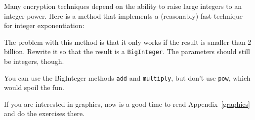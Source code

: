 \begin{exercise}
Many encryption techniques depend on the
ability to raise large integers to an integer power.  Here is a
method that implements a (reasonably) fast technique for integer
exponentiation:


The problem with this method is that it only works if the result
is smaller than 2 billion.  Rewrite it so that the result is
a {\tt BigInteger}.  The parameters should still be integers, though.

You can use the BigInteger methods {\tt add} and {\tt multiply}, but
don't use {\tt pow}, which would spoil the fun.
\end{exercise}


\begin{exercise}
If you are interested in graphics, now is a good time to read
Appendix~\ref{graphics} and do the exercises there.
\end{exercise}


